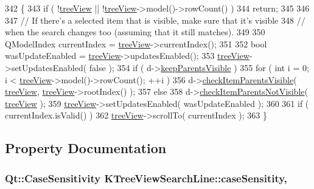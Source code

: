 \begin{DoxyCode}
342 \{
343   \textcolor{keywordflow}{if} ( !\hyperlink{classKTreeViewSearchLine_aeeec1dac59277de847c59fbad49d53b6}{treeView} || !\hyperlink{classKTreeViewSearchLine_aeeec1dac59277de847c59fbad49d53b6}{treeView}->model()->rowCount() )
344     \textcolor{keywordflow}{return};
345 
346 
347   \textcolor{comment}{// If there's a selected item that is visible, make sure that it's visible}
348   \textcolor{comment}{// when the search changes too (assuming that it still matches).}
349 
350   QModelIndex currentIndex = \hyperlink{classKTreeViewSearchLine_aeeec1dac59277de847c59fbad49d53b6}{treeView}->currentIndex();
351 
352   \textcolor{keywordtype}{bool} wasUpdateEnabled = \hyperlink{classKTreeViewSearchLine_aeeec1dac59277de847c59fbad49d53b6}{treeView}->updatesEnabled();
353   \hyperlink{classKTreeViewSearchLine_aeeec1dac59277de847c59fbad49d53b6}{treeView}->setUpdatesEnabled( \textcolor{keyword}{false} );
354   \textcolor{keywordflow}{if} ( d->\hyperlink{classKTreeViewSearchLine_1_1Private_adc388c2942a71f2ef94b21ef6edd1f2f}{keepParentsVisible} )
355     \textcolor{keywordflow}{for} ( \textcolor{keywordtype}{int} i = 0; i < \hyperlink{classKTreeViewSearchLine_aeeec1dac59277de847c59fbad49d53b6}{treeView}->model()->rowCount(); ++i )
356       d->\hyperlink{classKTreeViewSearchLine_1_1Private_aec44f42e82456b943bfb15ee78a5d3ea}{checkItemParentsVisible}( \hyperlink{classKTreeViewSearchLine_aeeec1dac59277de847c59fbad49d53b6}{treeView}, 
      \hyperlink{classKTreeViewSearchLine_aeeec1dac59277de847c59fbad49d53b6}{treeView}->rootIndex() );
357   \textcolor{keywordflow}{else}
358     d->\hyperlink{classKTreeViewSearchLine_1_1Private_ae08157a870a33a1ada866e2810ba59a3}{checkItemParentsNotVisible}( \hyperlink{classKTreeViewSearchLine_aeeec1dac59277de847c59fbad49d53b6}{treeView} );
359   \hyperlink{classKTreeViewSearchLine_aeeec1dac59277de847c59fbad49d53b6}{treeView}->setUpdatesEnabled( wasUpdateEnabled );
360 
361   \textcolor{keywordflow}{if} ( currentIndex.isValid() )
362     \hyperlink{classKTreeViewSearchLine_aeeec1dac59277de847c59fbad49d53b6}{treeView}->scrollTo( currentIndex );
363 \}
\end{DoxyCode}


\subsection{Property Documentation}
\hypertarget{classKTreeViewSearchLine_aae0f956eff2d0d6cd9d883a646a33da8}{
\subsubsection[{case\+Sensitity}]{\setlength{\rightskip}{0pt plus 5cm}Qt\+::\+Case\+Sensitivity K\+Tree\+View\+Search\+Line\+::case\+Sensitity\hspace{0.3cm}{\ttfamily [read]}, {\ttfamily [write]}}}\label{classKTreeViewSearchLine_aae0f956eff2d0d6cd9d883a646a33da8}



